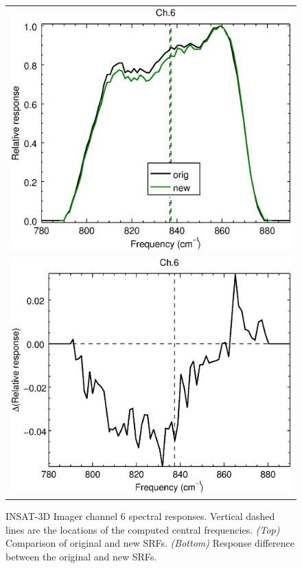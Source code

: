 \begin{figure}[H]
  \centering
  \begin{tabular}{c}
    \includegraphics[scale=0.55]{graphics/imgr/srf/imgr_insat3d-6.eps} \\
    \includegraphics[scale=0.55]{graphics/imgr/srf/imgr_insat3d-6.difference.eps}
  \end{tabular}
  \caption{INSAT-3D Imager channel 6 spectral responses. Vertical dashed lines are the locations of the computed central frequencies. \emph{(Top)} Comparison of original and new SRFs. \emph{(Bottom)} Response difference between the original and new SRFs.}
  \label{fig:imgr_ch6}
\end{figure}
